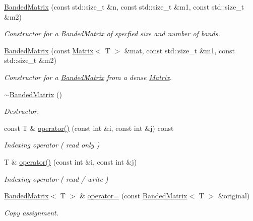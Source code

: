 \begin{DoxyCompactItemize}
\item 
\hyperlink{classLuna_1_1BandedMatrix_acee771bc0a0c647a289fd189b882d064}{Banded\+Matrix} (const std\+::size\+\_\+t \&n, const std\+::size\+\_\+t \&m1, const std\+::size\+\_\+t \&m2)
\begin{DoxyCompactList}\small\item\em Constructor for a \hyperlink{classLuna_1_1BandedMatrix}{Banded\+Matrix} of specfied size and number of bands. \end{DoxyCompactList}\item 
\hyperlink{classLuna_1_1BandedMatrix_a81f1a844d62c38fbffe36d63e61c85c8}{Banded\+Matrix} (const \hyperlink{classLuna_1_1Matrix}{Matrix}$<$ T $>$ \&mat, const std\+::size\+\_\+t \&m1, const std\+::size\+\_\+t \&m2)
\begin{DoxyCompactList}\small\item\em Constructor for a \hyperlink{classLuna_1_1BandedMatrix}{Banded\+Matrix} from a dense \hyperlink{classLuna_1_1Matrix}{Matrix}. \end{DoxyCompactList}\item 
\hyperlink{classLuna_1_1BandedMatrix_a299b47780a3ba18504c2d19998818bdf}{$\sim$\+Banded\+Matrix} ()
\begin{DoxyCompactList}\small\item\em Destructor. \end{DoxyCompactList}\item 
const T \& \hyperlink{classLuna_1_1BandedMatrix_aea48914345ba2db61aa0b8876c69d36e}{operator()} (const int \&i, const int \&j) const
\begin{DoxyCompactList}\small\item\em Indexing operator ( read only ) \end{DoxyCompactList}\item 
T \& \hyperlink{classLuna_1_1BandedMatrix_a0a04982508fd1af82063900788f179de}{operator()} (const int \&i, const int \&j)
\begin{DoxyCompactList}\small\item\em Indexing operator ( read / write ) \end{DoxyCompactList}\item 
\hyperlink{classLuna_1_1BandedMatrix}{Banded\+Matrix}$<$ T $>$ \& \hyperlink{classLuna_1_1BandedMatrix_a25ca62173e2ad70df640482546b276df}{operator=} (const \hyperlink{classLuna_1_1BandedMatrix}{Banded\+Matrix}$<$ T $>$ \&original)
\begin{DoxyCompactList}\small\item\em Copy assignment. \end{DoxyCompactList}\item 

\end{DoxyCompactItemize}
